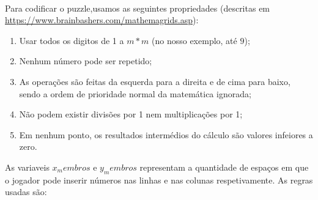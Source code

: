 \documentclass{article}
\begin{document}
\paragraph{} Para codificar o puzzle,usamos as seguintes propriedades (descritas em {\url{https://www.brainbashers.com/mathemagrids.asp}}):
 \begin{enumerate}
 \item Usar todos os digitos de 1 a $m*m$ (no nosso exemplo, até $9$);
 \item Nenhum número pode ser repetido;
 \item As operações são feitas da esquerda para a direita e de cima para baixo, sendo a ordem de prioridade normal da matemática ignorada;
 \item Não podem existir divisões por 1 nem multiplicações por 1;
\item Em nenhum ponto, os resultados intermédios do cálculo são valores infeiores a zero.
 \end{enumerate}

As variaveis $x_membros$ e $y_membros$ representam a quantidade de espaços em que o jogador pode inserir números nas linhas e nas colunas respetivamente. As regras usadas são:
\end{document}
